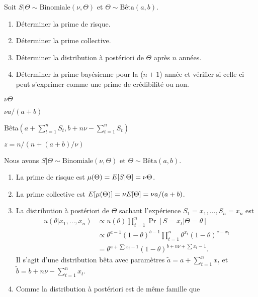 \begin{exercice}
  Soit $S|\Theta \sim \text{Binomiale}(\nu, \Theta)$ et $\Theta \sim
  \text{Bêta}(a, b)$.
  \begin{enumerate}
  \item Déterminer la prime de risque.
  \item Déterminer la prime collective.
  \item Déterminer la distribution à postériori de $\Theta$ après $n$
    années.
  \item Déterminer la prime bayésienne pour la ($n+1$){\ieme} année et
    vérifier si celle-ci peut s'exprimer comme une prime de
    crédibilité ou non.
  \end{enumerate}
  \begin{rep}
    \begin{inparaenum}
    \item $\nu \Theta$
    \item $\nu a/(a + b)$
    \item Bêta$(a + \sum_{t=1}^n S_t, b + n \nu -
      \sum_{t=1}^n S_t)$
    \item $z = n/(n + (a + b)/\nu)$
    \end{inparaenum}
  \end{rep}
  \begin{sol}
    Nous avons $S|\Theta \sim \text{Binomiale}(\nu, \Theta)$ et
    $\Theta \sim \text{Bêta}(a, b)$.
    \begin{enumerate}
    \item La prime de risque est $\mu(\Theta) = E [ S|\Theta ] = \nu
      \Theta$.
    \item La prime collective est $E [ \mu(\Theta) ] = \nu
      E [ \Theta ] = \nu a/(a + b)$.
    \item La distribution à postériori de $\Theta$ sachant
      l'expérience $S_1 = x_1, \dots, S_n = x_n$ est
      \begin{align*}
        u(\theta|x_1, \dots, x_n)
        &\propto u(\theta) \prod_{t=1}^n \Pr[S = x_t|\Theta = \theta] \\
        &\propto \theta^{a-1} (1 - \theta)^{b-1}
        \prod_{t=1}^n \theta^{x_t} (1 - \theta)^{\nu - x_t} \\
        &= \theta^{a + \sum x_t - 1} (1 - \theta)^{b + n \nu
          + \sum x_t - 1}.
      \end{align*}
      Il s'agit d'une distribution bêta avec paramètres $\tilde{a} =
      a + \sum_{t=1}^n x_t$ et $\tilde{b} = b + n \nu -
      \sum_{t=1}^n x_t$.
    \item Comme la distribution à postériori est de même famille que

\end{enumerate}
\end{sol}
\end{exercice}
